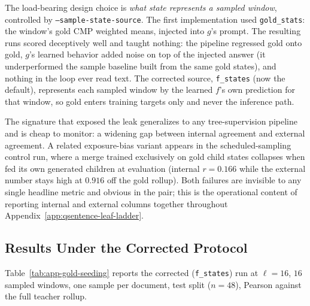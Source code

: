 The load-bearing design choice is \emph{what state represents a
sampled window}, controlled by \texttt{--sample-state-source}. The
first implementation used \texttt{gold\_stats}: the window's gold CMP
weighted means, injected into $g$'s prompt. The resulting runs scored
deceptively well and taught nothing: the pipeline regressed gold onto
gold, $g$'s learned behavior added noise on top of the injected
answer (it underperformed the sample baseline built from the same
gold states), and nothing in the loop ever read text. The corrected
source, \texttt{f\_states} (now the default), represents each sampled
window by the learned $f$'s own prediction for that window, so gold
enters training targets only and never the inference path.

The signature that exposed the leak generalizes to any
tree-supervision pipeline and is cheap to monitor: a widening gap
between internal agreement and external agreement. A related
exposure-bias variant appears in the scheduled-sampling control run,
where a merge trained exclusively on gold child states collapses when
fed its own generated children at evaluation (internal $r = 0.166$
while the external number stays high at $0.916$ off the gold rollup).
Both failures are invisible to any single headline metric and obvious
in the pair; this is the operational content of reporting internal and
external columns together throughout
Appendix~\ref{app:qsentence-leaf-ladder}.

\subsection{Results Under the Corrected Protocol}

Table~\ref{tab:app-gold-seeding} reports the corrected
(\texttt{f\_states}) run at $\ell = 16$, $16$ sampled windows, one
sample per document, test split ($n = 48$), Pearson against the full
teacher rollup.


